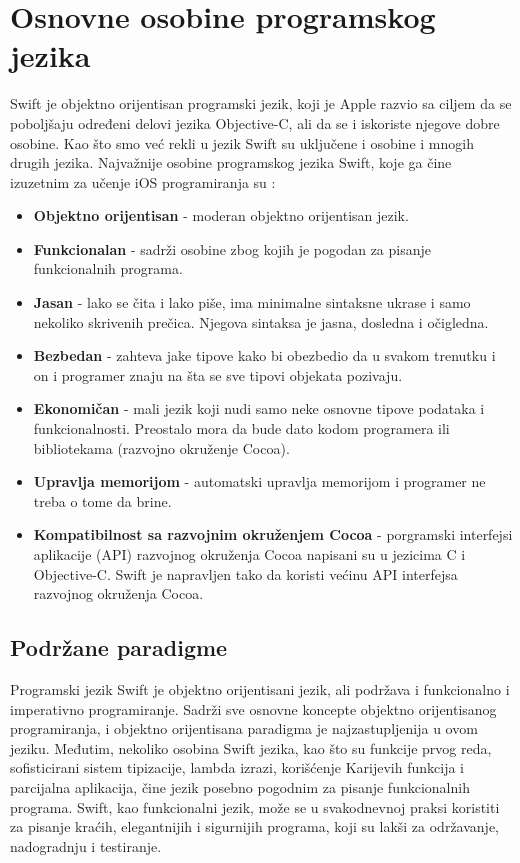 \documentclass[a4paper]{article}
\begin{document}
\section{Osnovne osobine programskog jezika}	
\label{sec:treciDeo}

Swift je objektno orijentisan programski jezik, koji je Apple razvio sa ciljem da 
se poboljšaju određeni delovi jezika Objective-C, ali da se i iskoriste njegove
dobre osobine. Kao što smo već rekli u jezik Swift su uključene i osobine i mnogih drugih jezika. Najvažnije osobine programskog jezika Swift, koje ga čine izuzetnim za učenje iOS programiranja su \cite{swift_programming}:
\begin{itemize}
\item\textbf{Objektno orijentisan} - moderan objektno orijentisan jezik.
\item\textbf{Funkcionalan} - sadrži osobine zbog kojih je pogodan za pisanje funkcionalnih programa.
\item\textbf{Jasan} - lako se čita i lako piše, ima minimalne sintaksne ukrase i samo nekoliko skrivenih prečica. Njegova sintaksa je jasna, dosledna i očigledna.
\item\textbf{Bezbedan} - zahteva jake tipove kako bi obezbedio da u svakom trenutku i on i programer znaju na šta se sve tipovi objekata pozivaju.
\item\textbf{Ekonomičan} - mali jezik koji nudi samo neke osnovne tipove podataka i funkcionalnosti. Preostalo mora da bude dato kodom programera ili bibliotekama (razvojno okruženje Cocoa).
\item\textbf{Upravlja memorijom} - automatski upravlja memorijom i programer ne treba o tome da brine.
\item\textbf{Kompatibilnost sa razvojnim okruženjem Cocoa} - porgramski interfejsi aplikacije (API) razvojnog okruženja Cocoa napisani su u jezicima C i Objective-C. Swift je napravljen tako da koristi većinu API interfejsa razvojnog okruženja Cocoa.
\end{itemize}

\subsection{Podržane paradigme}
\label{subsec:podnaslovParadigma}

Programski jezik Swift je objektno orijentisani jezik, ali podržava i funkcionalno i imperativno
programiranje. Sadrži sve osnovne koncepte objektno orijentisanog programiranja, i objektno orijentisana paradigma je najzastupljenija u ovom jeziku. Međutim, nekoliko osobina Swift jezika, kao što su funkcije prvog reda, sofisticirani sistem tipizacije, lambda izrazi, korišćenje Karijevih funkcija i parcijalna aplikacija, čine jezik posebno pogodnim za pisanje funkcionalnih programa. Swift, kao funkcionalni jezik, može se u svakodnevnoj praksi koristiti za pisanje kraćih, elegantnijih i sigurnijih programa, koji su lakši za održavanje, nadogradnju i testiranje.
\end{document}
